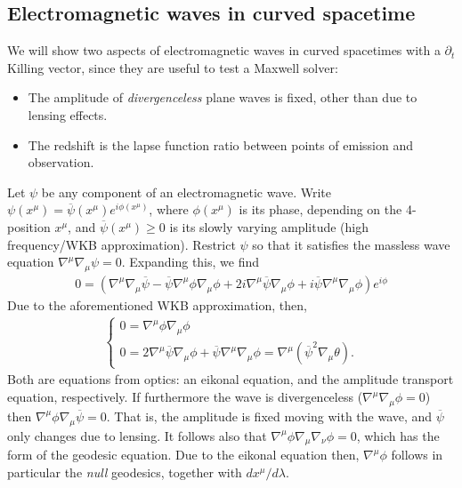 \documentclass{article}
\begin{document}
\subsection{Electromagnetic waves in curved spacetime}

We will show two aspects of electromagnetic waves in curved spacetimes with a $\partial_t$ Killing vector, since they are useful to test a Maxwell solver:
\begin{itemize}
  \item The amplitude of \textit{divergenceless} plane waves is fixed, other than due to lensing effects.
  \item The redshift is the lapse function ratio between points of emission and observation.
\end{itemize}

\noindent
Let $\psi$ be any component of an electromagnetic wave.
Write $\psi(x^\mu)=\overline\psi(x^\mu)e^{i\phi(x^\mu)}$, where $\phi(x^\mu)$ is its phase, depending on the 4-position $x^\mu$, and $\overline\psi(x^\mu)\geq0$ is its slowly varying amplitude (high frequency/WKB approximation).
Restrict $\psi$ so that it satisfies the massless wave equation $\nabla^\mu\nabla_\mu\psi=0$.
Expanding this, we find
\begin{align}
  0=\left(\nabla^\mu\nabla_\mu\overline\psi-\overline\psi\nabla^\mu\phi\nabla_\mu\phi+2i\nabla^\mu\overline\psi\nabla_\mu\phi+i\overline\psi\nabla^\mu\nabla_\mu\phi\right)e^{i\phi}
\end{align}
Due to the aforementioned WKB approximation, then,
\begin{align}
\begin{cases}
  0=\nabla^\mu\phi\nabla_\mu\phi\\
  0=2\nabla^\mu\overline\psi\nabla_\mu\phi+\overline\psi\nabla^\mu\nabla_\mu\phi=\nabla^\mu(\overline\psi^2\nabla_\mu\theta).
\end{cases}
\end{align}
Both are equations from optics: an eikonal equation, and the amplitude transport equation, respectively.
If furthermore the wave is divergenceless ($\nabla^\mu\nabla_\mu\phi=0$) then $\nabla^\mu\phi\nabla_\mu\overline\psi=0$.
That is, the amplitude is fixed moving with the wave, and $\overline\psi$ only changes due to lensing.
It follows also that $\nabla^\mu\phi\nabla_\mu\nabla_\nu\phi=0$, which has the form of the geodesic equation.
Due to the eikonal equation then, $\nabla^\mu\phi$ follows in particular the \textit{null} geodesics, together with $dx^\mu/d\lambda$.
\end{document}
